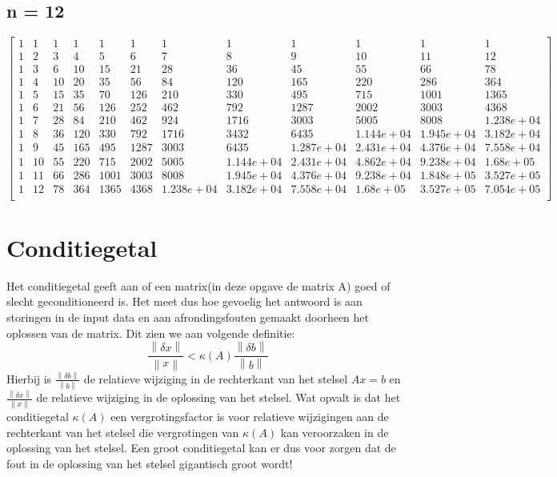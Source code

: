 \documentclass[10pt,a4paper,twocolumn]{article}
\begin{document}
\subsection{n = 12}
\setcounter{MaxMatrixCols}{12}
$$
\begin{bmatrix}
1 & 1 & 1 & 1 & 1 & 1 & 1 & 1 & 1 & 1 & 1 & 1 \\
1 & 2 & 3 & 4 & 5 & 6 & 7 & 8 & 9 & 10 & 11 & 12 \\
1 & 3 & 6 & 10 & 15 & 21 & 28 & 36 & 45 & 55 & 66 & 78 \\
1 & 4 & 10 & 20 & 35 & 56 & 84 & 120 & 165 & 220 & 286 & 364 \\
1 & 5 & 15 & 35 & 70 & 126 & 210 & 330 & 495 & 715 & 1001 & 1365 \\
1 & 6 & 21 & 56 & 126 & 252 & 462 & 792 & 1287 & 2002 & 3003 & 4368 \\
1 & 7 & 28 & 84 & 210 & 462 & 924 & 1716 & 3003 & 5005 & 8008 & 1.238e+04 \\
1 & 8 & 36 & 120 & 330 & 792 & 1716 & 3432 & 6435 & 1.144e+04 & 1.945e+04 & 3.182e+04 \\
1 & 9 & 45 & 165 & 495 & 1287 & 3003 & 6435 & 1.287e+04 & 2.431e+04 & 4.376e+04 & 7.558e+04 \\
1 & 10 & 55 & 220 & 715 & 2002 & 5005 & 1.144e+04 & 2.431e+04 & 4.862e+04 & 9.238e+04 & 1.68e+05 \\
1 & 11 & 66 & 286 & 1001 & 3003 & 8008 & 1.945e+04 & 4.376e+04 & 9.238e+04 & 1.848e+05 & 3.527e+05 \\
1 & 12 & 78 & 364 & 1365 & 4368 & 1.238e+04 & 3.182e+04 & 7.558e+04 & 1.68e+05 & 3.527e+05 & 7.054e+05 \\
\end{bmatrix}
$$
\clearpage
\section{Conditiegetal}
Het conditiegetal geeft aan of een matrix(in deze opgave de matrix A) goed of slecht geconditioneerd is. Het meet dus hoe gevoelig het antwoord is aan storingen in de input data en aan afrondingsfouten gemaakt doorheen het oplossen van de matrix. Dit zien we aan volgende definitie: 
$$\frac{\left \| \delta{x} \right \|}{\left \| x \right \|} < \kappa(A)\frac{\left \| \delta{b} \right \|}{\left \| b \right \|} $$
Hierbij is $\frac{\left \| \delta{b} \right \|}{\left \| b \right \|}$ de relatieve wijziging in de rechterkant van het stelsel $Ax = b$ en $\frac{\left \| \delta{x} \right \|}{\left \| x \right \|}$ de relatieve wijziging in de oplossing van het stelsel. Wat opvalt is dat het conditiegetal $\kappa(A)$ een vergrotingsfactor is voor relatieve wijzigingen aan de rechterkant van het stelsel die vergrotingen van $\kappa(A)$ kan veroorzaken in de oplossing van het stelsel.
\newline
\newline
Een groot conditiegetal kan er dus voor zorgen dat de fout in de oplossing van het stelsel gigantisch groot wordt!
\end{document}

